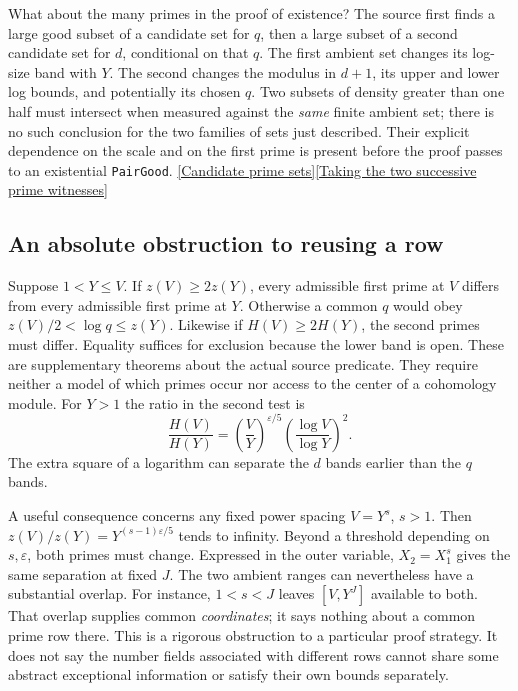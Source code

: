 \documentclass[12pt,letterpaper]{article}
\begin{document}
What about the many primes in the proof of existence? The source first finds a large good subset of a candidate set for \(q\), then a large subset of a second candidate set for \(d\), conditional on that \(q\). The first ambient set changes its log-size band with \(Y\). The second changes the modulus in \(d+1\), its upper and lower log bounds, and potentially its chosen \(q\). Two subsets of density greater than one half must intersect when measured against the \emph{same} finite ambient set; there is no such conclusion for the two families of sets just described. Their explicit dependence on the scale and on the first prime is present before the proof passes to an existential \texttt{PairGood}. \href{https://github.com/nousentllc/riemann-hypothesis/blob/40e56bab026552e089d7afcfeff08d2defb9c005/src/Development/AutomorphicArithmetic/MeanSquareBounds/PrimeSetTwoBounds.lean#L35-L65}{[Candidate prime sets]}\quad\href{https://github.com/nousentllc/riemann-hypothesis/blob/40e56bab026552e089d7afcfeff08d2defb9c005/src/Development/AutomorphicArithmetic/MeanSquareBounds/PairExists.lean#L27-L43}{[Taking the two successive prime witnesses]}

\subsection{An absolute obstruction to reusing a row}

Suppose \(1<Y\le V\). If \(z(V)\ge2z(Y)\), every admissible first prime at \(V\) differs from every admissible first prime at \(Y\). Otherwise a common \(q\) would obey \(z(V)/2<\log q\le z(Y)\). Likewise if \(H(V)\ge2H(Y)\), the second primes must differ. Equality suffices for exclusion because the lower band is open. These are supplementary theorems about the actual source predicate. They require neither a model of which primes occur nor access to the center of a cohomology module. For \(Y>1\) the ratio in the second test is
\[
 \frac{H(V)}{H(Y)}
  =\left(\frac VY\right)^{\varepsilon/5}
    \left(\frac{\log V}{\log Y}\right)^2.
\]
The extra square of a logarithm can separate the \(d\) bands earlier than the \(q\) bands.

A useful consequence concerns any fixed power spacing \(V=Y^s\), \(s>1\). Then \(z(V)/z(Y)=Y^{(s-1)\varepsilon/5}\) tends to infinity. Beyond a threshold depending on \(s,\varepsilon\), both primes must change. Expressed in the outer variable, \(X_2=X_1^s\) gives the same separation at fixed \(J\). The two ambient ranges can nevertheless have a substantial overlap. For instance, \(1<s<J\) leaves \([V,Y^J]\) available to both. That overlap supplies common \emph{coordinates}; it says nothing about a common prime row there. This is a rigorous obstruction to a particular proof strategy. It does not say the number fields associated with different rows cannot share some abstract exceptional information or satisfy their own bounds separately.
\end{document}
